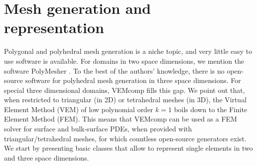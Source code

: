 \documentclass[a4paper]{article}
\begin{document}
\section{Mesh generation and representation}
\label{sec:meshes}

Polygonal and polyhedral mesh generation is a niche topic, and very little easy to use software is available.  For domains in two space dimensions, we mention the software PolyMesher \cite{Talischi_2012}. To the best of the authors' knowledge, there is no open-source software for polyhedral mesh generation in three space dimensions. For special three dimensional domains,  VEMcomp fills this gap. We point out that, when restricted to triangular (in 2D) or tetrahedral meshes (in 3D), the Virtual Element Method (VEM) of low polynomial order $k=1$ boils down to the Finite Element Method (FEM).  This means that VEMcomp can be used as a FEM solver for surface and bulk-surface PDEs, when provided with triangular/tetrahedral meshes,  for which countless open-source generators exist.  We start by presenting basic classes that allow to represent single elements in two and three space dimensions. 
\end{document}
